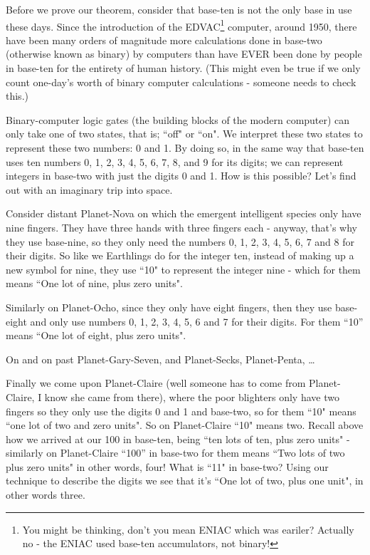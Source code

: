 \documentclass{article}
\begin{document}
Before we prove our theorem,
consider that base-ten is not the only base in use these days.
Since the introduction of the EDVAC\footnote{You might be thinking, don't you
mean ENIAC which was eariler? Actually no - the ENIAC
used base-ten accumulators, not binary!} computer, around 1950,
there have been many orders of magnitude more calculations done
in base-two (otherwise known as binary) by computers than have EVER
been done by people in base-ten for the entirety of human history.
(This might even be true if we only count one-day's worth of
binary computer calculations - someone needs to check this.)

Binary-computer logic gates (the building blocks of the modern computer)
can only take one of two states, that is; ``off" or ``on".
We interpret these two states to represent these two numbers: 0 and 1.
By doing so, in the same way that base-ten uses ten numbers 0,
1, 2, 3, 4, 5, 6, 7, 8, and 9 for its digits; we can represent integers
in base-two with just the digits 0 and 1. How is this possible?
Let's find out with an imaginary trip into space.

Consider distant Planet-Nova on which the emergent
intelligent species only have nine fingers.
They have three hands with three fingers each - anyway,
that's why they use base-nine, so they only need the numbers 0,
1, 2, 3, 4, 5, 6, 7 and 8 for their digits.
So like we Earthlings do for the integer ten,
instead of making up a new symbol for nine,
they use ``10" to represent the integer nine - which
for them means ``One lot of nine, plus zero units".

Similarly on Planet-Ocho, since they only have eight fingers,
then they use base-eight and only use numbers 0, 1,
2, 3, 4, 5, 6 and 7 for their digits. For them ``10''
means ``One lot of eight, plus zero units".

On and on past Planet-Gary-Seven, and Planet-Secks, Planet-Penta, \dots{}

Finally we come upon Planet-Claire (well someone
has to come from Planet-Claire,
I know she came from there),
where the poor blighters only have two fingers
so they only use the digits 0 and 1 and base-two,
so for them ``10" means ``one lot of two and zero units".
So on Planet-Claire ``10" means two.
Recall above how we arrived at our 100 in base-ten,
being ``ten lots of ten,
plus zero units" - similarly on Planet-Claire ``100''
in base-two for them means ``Two lots of two plus zero units" in other words,
four! What is ``11" in base-two? Using our technique to
describe the digits we see that it's ``One lot of two, plus one unit",
in other words three.
\end{document}
